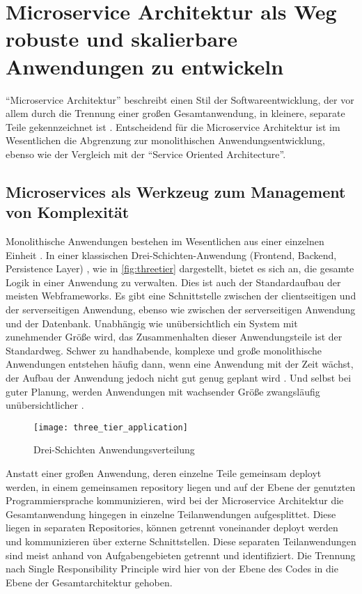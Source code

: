 \chapter{Microservice Architektur als Weg robuste und skalierbare Anwendungen zu entwickeln}
\enquote{Microservice Architektur} beschreibt einen Stil der Softwareentwicklung, der vor allem durch die Trennung einer großen Gesamtanwendung, in kleinere, separate Teile gekennzeichnet ist \cite[vgl.][Seite 2]{newman2015building}.
Entscheidend für die Microservice Architektur ist im Wesentlichen die Abgrenzung zur monolithischen Anwendungsentwicklung, ebenso wie der Vergleich mit der \enquote{Service Oriented Architecture}.

\section{Microservices als Werkzeug zum Management von Komplexität}
Monolithische Anwendungen bestehen im Wesentlichen aus einer einzelnen Einheit \cite[vgl.][]{Fowler:Intro}. In einer klassischen Drei-Schichten-Anwendung (Frontend, Backend, Persistence Layer) \cite[vgl.][]{MSDN:TTA}, wie in \autoref{fig:threetier} dargestellt, bietet es sich an, die gesamte Logik in einer Anwendung zu verwalten. Dies ist auch der Standardaufbau der meisten Webframeworks. Es gibt eine Schnittstelle zwischen der clientseitigen und der serverseitigen Anwendung, ebenso wie zwischen der serverseitigen Anwendung und der Datenbank. Unabhängig wie unübersichtlich ein System mit zunehmender Größe wird, das Zusammenhalten dieser Anwendungsteile ist der Standardweg. Schwer zu handhabende, komplexe und große monolithische Anwendungen entstehen häufig dann, wenn eine Anwendung mit der Zeit wächst, der Aufbau der Anwendung jedoch nicht gut genug geplant wird \cite[vgl.][]{infaktuell}. Und selbst bei guter Planung, werden Anwendungen mit wachsender Größe zwangsläufig unübersichtlicher \cite[vgl.][]{infaktuell}.
\begin{figure}[!ht]
    \caption{Drei-Schichten Anwendungsverteilung \cite{ThreeTieredDistribution}}
    \label{fig:threetier}
    \texttt{[image: three\_tier\_application]}
\end{figure}

Anstatt einer großen Anwendung, deren einzelne Teile gemeinsam deployt werden, in einem gemeinsamen repository liegen und auf der Ebene der genutzten Programmiersprache kommunizieren, wird bei der Microservice Architektur die Gesamtanwendung hingegen in einzelne Teilanwendungen aufgesplittet. Diese liegen in separaten Repositories, können getrennt voneinander deployt werden und kommunizieren über externe Schnittstellen. Diese separaten Teilanwendungen sind meist anhand von Aufgabengebieten getrennt und identifiziert. Die Trennung nach Single Responsibility Principle \cite[vgl.][Seite 108]{Martin:SRP} wird hier von der Ebene des Codes in die Ebene der Gesamtarchitektur gehoben.

